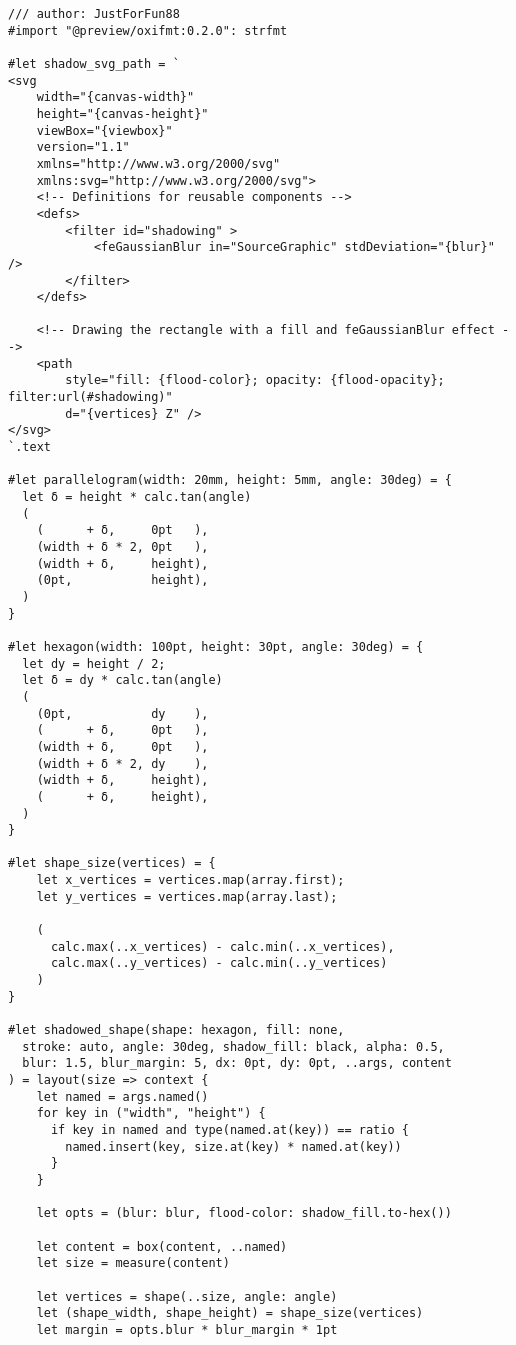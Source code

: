 \begin{verbatim}
/// author: JustForFun88
#import "@preview/oxifmt:0.2.0": strfmt

#let shadow_svg_path = `
<svg
    width="{canvas-width}"
    height="{canvas-height}"
    viewBox="{viewbox}"
    version="1.1"
    xmlns="http://www.w3.org/2000/svg"
    xmlns:svg="http://www.w3.org/2000/svg">
    <!-- Definitions for reusable components -->
    <defs>
        <filter id="shadowing" >
            <feGaussianBlur in="SourceGraphic" stdDeviation="{blur}" />
        </filter>
    </defs>

    <!-- Drawing the rectangle with a fill and feGaussianBlur effect -->
    <path
        style="fill: {flood-color}; opacity: {flood-opacity}; filter:url(#shadowing)"
        d="{vertices} Z" />
</svg>
`.text

#let parallelogram(width: 20mm, height: 5mm, angle: 30deg) = {
  let δ = height * calc.tan(angle)
  (
    (      + δ,     0pt   ),
    (width + δ * 2, 0pt   ),
    (width + δ,     height),
    (0pt,           height),
  )
}

#let hexagon(width: 100pt, height: 30pt, angle: 30deg) = {
  let dy = height / 2;
  let δ = dy * calc.tan(angle)
  (
    (0pt,           dy    ),
    (      + δ,     0pt   ),
    (width + δ,     0pt   ),
    (width + δ * 2, dy    ),
    (width + δ,     height),
    (      + δ,     height),
  )
}

#let shape_size(vertices) = {
    let x_vertices = vertices.map(array.first);
    let y_vertices = vertices.map(array.last);

    (
      calc.max(..x_vertices) - calc.min(..x_vertices),
      calc.max(..y_vertices) - calc.min(..y_vertices)
    )
}

#let shadowed_shape(shape: hexagon, fill: none,
  stroke: auto, angle: 30deg, shadow_fill: black, alpha: 0.5, 
  blur: 1.5, blur_margin: 5, dx: 0pt, dy: 0pt, ..args, content
) = layout(size => context {
    let named = args.named()
    for key in ("width", "height") {
      if key in named and type(named.at(key)) == ratio {
        named.insert(key, size.at(key) * named.at(key))
      }
    }

    let opts = (blur: blur, flood-color: shadow_fill.to-hex())
       
    let content = box(content, ..named)
    let size = measure(content)

    let vertices = shape(..size, angle: angle)
    let (shape_width, shape_height) = shape_size(vertices)
    let margin = opts.blur * blur_margin * 1pt


\end{verbatim}

